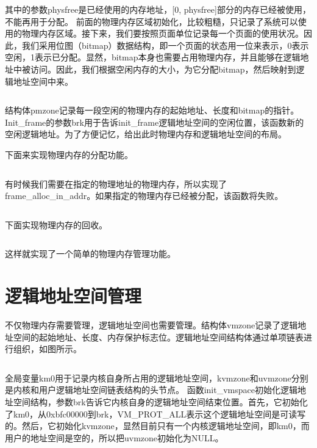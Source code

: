 \documentclass[main.tex]{subfiles}
\begin{document}
\begin{CJK*}{UTF8}{song}
\inputminted[firstline=207,lastline=216,linenos,numbersep=5pt,frame=lines,framesep=2mm]{c}{src/chapter04/kernel/machdep.c}

其中的参数physfree是已经使用的内存地址，[0, physfree]部分的内存已经被使用，不能再用于分配。
前面的物理内存区域初始化，比较粗糙，只记录了系统可以使用的物理内存区域。接下来，我们要按照页面单位记录每一个页面的使用状况。因此，我们采用位图（bitmap）数据结构，即一个页面的状态用一位来表示，0表示空闲，1表示已分配。显然，bitmap本身也需要占用物理内存，并且能够在逻辑地址中被访问。因此，我们根据空闲内存的大小，为它分配bitmap，然后映射到逻辑地址空间中来。

\inputminted[firstline=23,lastline=58,linenos,numbersep=5pt,frame=lines,framesep=2mm]{c}{src/chapter04/kernel/frame.c}

结构体pmzone记录每一段空闲的物理内存的起始地址、长度和bitmap的指针。Init\_frame的参数brk用于告诉init\_frame逻辑地址空间的空闲位置，该函数新的空闲逻辑地址。为了方便记忆，给出此时物理内存和逻辑地址空间的布局。

下面来实现物理内存的分配功能。

\inputminted[firstline=86,lastline=109,linenos,numbersep=5pt,frame=lines,framesep=2mm]{c}{src/chapter04/kernel/frame.c}

有时候我们需要在指定的物理地址的物理内存，所以实现了frame\_alloc\_in\_addr。如果指定的物理内存已经被分配，该函数将失败。

\inputminted[firstline=60,lastline=84,linenos,numbersep=5pt,frame=lines,framesep=2mm]{c}{src/chapter04/kernel/frame.c}

下面实现物理内存的回收。

\inputminted[firstline=111,lastline=137,linenos,numbersep=5pt,frame=lines,framesep=2mm]{c}{src/chapter04/kernel/frame.c}

这样就实现了一个简单的物理内存管理功能。

\section{逻辑地址空间管理}
不仅物理内存需要管理，逻辑地址空间也需要管理。结构体vmzone记录了逻辑地址空间的起始地址、长度、内存保护标志位。逻辑地址空间结构体通过单项链表进行组织，如图所示。

\inputminted[firstline=24,lastline=36,linenos,numbersep=5pt,frame=lines,framesep=2mm]{c}{src/chapter04/kernel/page.c}

全局变量km0用于记录内核自身所占用的逻辑地址空间，kvmzone和uvmzone分别是内核和用户逻辑地址空间链表结构的头节点。
函数init\_vmspace初始化逻辑地址空间结构，参数brk告诉它内核自身的逻辑地址空间结束位置。首先，它初始化了km0，从0xbfc00000到brk，VM\_PROT\_ALL表示这个逻辑地址空间是可读写的。然后，它初始化kvmzone，显然目前只有一个内核逻辑地址空间，即km0，而用户的地址空间是空的，所以把uvmzone初始化为NULL。


\end{CJK*}
\end{document}
